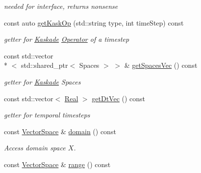 \begin{DoxyCompactItemize}
\begin{DoxyCompactList}\small\item\em needed for interface, returns nonsense \end{DoxyCompactList}\item 
const auto \hyperlink{classSpacy_1_1KaskadeParabolic_1_1PDE_1_1LinearBlockOperator_a8f199319fcd1e08b7598bd2f40b6ca76}{get\-Kask\-Op} (std\-::string type, int time\-Step) const 
\begin{DoxyCompactList}\small\item\em getter for \hyperlink{namespaceSpacy_1_1Kaskade}{Kaskade} \hyperlink{classSpacy_1_1Operator}{Operator} of a timestep \end{DoxyCompactList}\item 
const std\-::vector\\*
$<$ std\-::shared\-\_\-ptr$<$ Spaces $>$ $>$ \& \hyperlink{classSpacy_1_1KaskadeParabolic_1_1PDE_1_1LinearBlockOperator_a2603f76f51bdb94600edb9765084c5e2}{get\-Spaces\-Vec} () const 
\begin{DoxyCompactList}\small\item\em getter for \hyperlink{namespaceSpacy_1_1Kaskade}{Kaskade} Spaces \end{DoxyCompactList}\item 
const std\-::vector$<$ \hyperlink{classSpacy_1_1Real}{Real} $>$ \hyperlink{classSpacy_1_1KaskadeParabolic_1_1PDE_1_1LinearBlockOperator_a75d78988049d61be45f1a0f993a4d52a}{get\-Dt\-Vec} () const 
\begin{DoxyCompactList}\small\item\em getter for temporal timesteps \end{DoxyCompactList}\item 
\hypertarget{classSpacy_1_1OperatorBase_a2588f9b3e0188820c4c494e63293dc6f}{const \hyperlink{classSpacy_1_1VectorSpace}{Vector\-Space} \& \hyperlink{classSpacy_1_1OperatorBase_a2588f9b3e0188820c4c494e63293dc6f}{domain} () const }\label{classSpacy_1_1OperatorBase_a2588f9b3e0188820c4c494e63293dc6f}

\begin{DoxyCompactList}\small\item\em Access domain space $X$. \end{DoxyCompactList}\item 
\hypertarget{classSpacy_1_1OperatorBase_ab19d3b7a6f290b1079248f1e567e53d6}{const \hyperlink{classSpacy_1_1VectorSpace}{Vector\-Space} \& \hyperlink{classSpacy_1_1OperatorBase_ab19d3b7a6f290b1079248f1e567e53d6}{range} () const }\label{classSpacy_1_1OperatorBase_ab19d3b7a6f290b1079248f1e567e53d6}


\end{DoxyCompactItemize}

